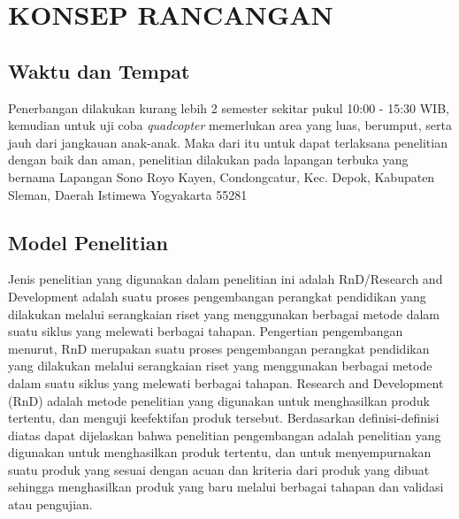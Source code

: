 
\chapter[KONSEP RANCANGAN / PRODUK / JASA / EVALUASI / PENGUJIAN]
{KONSEP RANCANGAN}
\section{Waktu dan Tempat}
Penerbangan dilakukan kurang lebih 2 semester sekitar pukul 10:00 - 15:30 WIB, kemudian untuk uji coba \textit{quadcopter} memerlukan area yang luas, berumput, serta jauh dari jangkauan anak-anak. Maka dari itu untuk dapat terlaksana penelitian dengan baik dan aman, penelitian dilakukan pada lapangan terbuka yang bernama Lapangan Sono Royo Kayen, Condongcatur, Kec. Depok, Kabupaten Sleman, Daerah Istimewa Yogyakarta 55281

\section{Model Penelitian}
Jenis penelitian yang digunakan dalam penelitian ini adalah RnD/Research and Development adalah suatu proses pengembangan perangkat pendidikan yang dilakukan melalui serangkaian riset yang menggunakan berbagai metode dalam suatu siklus yang melewati berbagai tahapan.  Pengertian pengembangan menurut\cite{okpatrioka2023research}, RnD merupakan suatu proses pengembangan perangkat pendidikan yang dilakukan melalui serangkaian riset yang menggunakan berbagai metode dalam suatu siklus yang melewati berbagai tahapan. Research and Development (RnD) adalah metode penelitian yang digunakan untuk menghasilkan produk tertentu, dan menguji keefektifan produk tersebut.  Berdasarkan definisi-definisi diatas dapat dijelaskan bahwa penelitian pengembangan adalah penelitian yang digunakan untuk menghasilkan produk tertentu, dan untuk menyempurnakan suatu produk yang sesuai dengan acuan dan kriteria dari produk yang dibuat sehingga menghasilkan produk yang baru melalui berbagai tahapan dan validasi atau pengujian.

